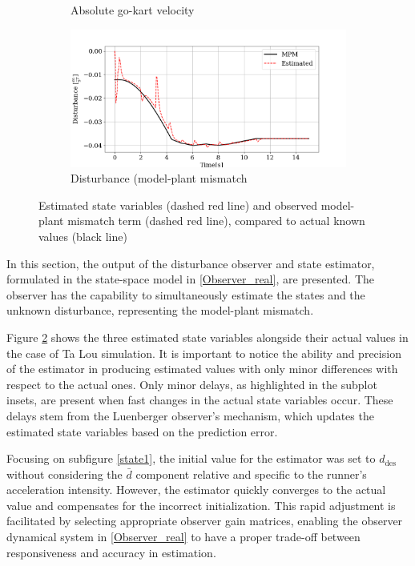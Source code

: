 \documentclass[a4paper,12pt,oneside]{book}
\begin{document}
\begin{figure}[h!]
\begin{subfigure}[b]{0.49\textwidth}
    \caption{Absolute go-kart velocity}
    \end{subfigure}
    \hfill
    \begin{subfigure}[b]{0.49\textwidth}
        \includegraphics[width=\textwidth]{Estimator/mpm.png}
    \caption{Disturbance (model-plant mismatch}
    \label{disturbance}
    \end{subfigure}
    \caption{Estimated state variables (dashed red line) and observed model-plant mismatch term (dashed red line), compared to actual known values (black line)}
\label{Estimator}
\end{figure}

In this section, the output of the disturbance observer and state estimator, formulated in the state-space model in \eqref{Observer_real}, are presented.
The observer has the capability to simultaneously estimate the states and the unknown disturbance, representing the model-plant mismatch.

Figure \ref{Estimator} shows the three estimated state variables alongside their actual values in the case of Ta Lou simulation.
It is important to notice the ability and precision of the estimator in producing estimated values with only minor differences with respect to the actual ones.
Only minor delays, as highlighted in the subplot insets, are present when fast changes in the actual state variables occur.
These delays stem from the Luenberger observer's mechanism, which updates the estimated state variables based on the prediction error.

Focusing on subfigure \ref{state1}, the initial value for the estimator was set to $d_\text{des}$ without considering the $\bar{d}$ component relative and specific to the runner's acceleration intensity. 
However, the estimator quickly converges to the actual value and compensates for the incorrect initialization. 
This rapid adjustment is facilitated by selecting appropriate observer gain matrices, enabling the observer dynamical system in \eqref{Observer_real} to have a proper trade-off between responsiveness and accuracy in estimation.
\end{document}

